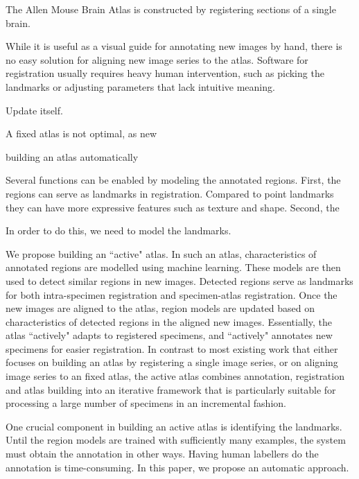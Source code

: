 \documentclass{llncs}
\begin{document}

The Allen Mouse Brain Atlas is constructed by registering sections of a single brain.

 While it is useful as a visual guide for annotating new images by hand, there is no easy solution for aligning new image series to the atlas. Software for registration usually requires heavy human intervention, such as picking the landmarks or adjusting parameters that lack intuitive meaning.


Update itself. 


A fixed atlas is not optimal, as new 

building an atlas automatically 

Several functions can be enabled by modeling the annotated regions. First, the regions can serve as landmarks in registration. Compared to point landmarks they can have more expressive features such as texture and shape. Second, the 


In order to do this, we need to model the landmarks. 

We propose building an ``active" atlas. In such an atlas, characteristics of annotated regions are modelled using machine learning. These models are then used to detect similar regions in new images. Detected regions serve as landmarks for both intra-specimen registration and specimen-atlas registration. Once the new images are aligned to the atlas, region models are updated based on characteristics of detected regions in the aligned new images. Essentially, the atlas ``actively" adapts to registered specimens, and ``actively" annotates new specimens for easier registration. In contrast to most existing work that either focuses on building an atlas by registering a single image series, or on aligning image series to an fixed atlas, the active atlas combines annotation, registration and atlas building into an iterative framework that is particularly suitable for processing a large number of specimens in an incremental fashion.


One crucial component in building an active atlas is identifying the landmarks. Until the region models are trained with sufficiently many examples, the system must obtain the annotation in other ways. Having human labellers do the annotation is time-consuming. In this paper, we propose an automatic approach.
\end{document}
